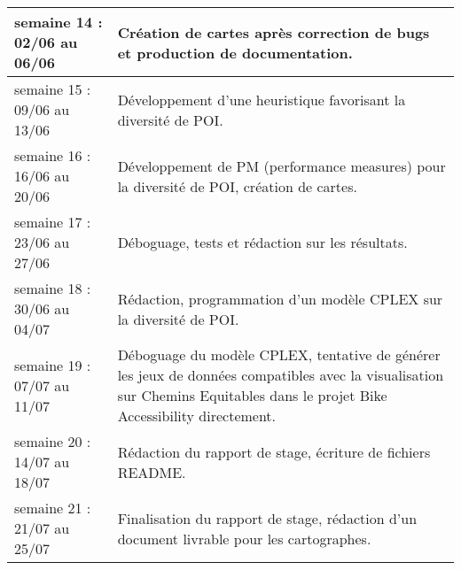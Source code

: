 \begin{longtable}[H]{| m{5cm} | m{10cm} |}
\hline
semaine 14 : 02/06 au 06/06 & Création de cartes après correction de bugs et production de documentation.\\
\hline
semaine 15 : 09/06 au 13/06 & Développement d'une heuristique favorisant la diversité de POI. \\
\hline
semaine 16 : 16/06 au 20/06 & Développement de PM (performance measures) pour la diversité de POI, création de cartes. \\
\hline
semaine 17 : 23/06 au 27/06 & Déboguage, tests et rédaction sur les résultats. \\
\hline
semaine 18 : 30/06 au 04/07 & Rédaction, programmation d'un modèle CPLEX sur la diversité de POI. \\
\hline
semaine 19 : 07/07 au 11/07 & Déboguage du modèle CPLEX, tentative de générer les jeux de données compatibles avec la visualisation sur Chemins Equitables dans le projet Bike Accessibility directement. \\
\hline
semaine 20 : 14/07 au 18/07 & Rédaction du rapport de stage, écriture de fichiers README. \\
\hline
semaine 21 : 21/07 au 25/07 & Finalisation du rapport de stage, rédaction d'un document livrable pour les cartographes. \\
\end{longtable}